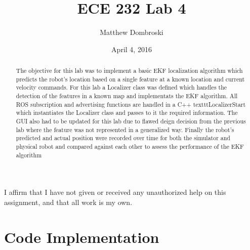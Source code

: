 \documentclass[letterpaper,12pt]{article}
\begin{document}
\title{ECE 232 Lab 4}
\author{Matthew Dombroski}
\date{April 4, 2016}
\maketitle


 I affirm that I have not given or received any unauthorized help on this assignment,
and that all work is my own.
\begin{abstract}
The objective for this lab was to implement a basic EKF localization algorithm which predicts the robot's location based on a single feature at a known location and current velocity commands. For this lab a Localizer class was defined which handles the detection of the features in a known map and implementats the EKF algorithm. All ROS subscription and advertising functions are handled in a C++ texttt{LocalizerStart} which instantiates the Localizer class and passes to it the required information. The GUI also had to be updated for this lab due to flawed deign decision from the previous lab where the feature was not represented in a generalized way. Finally the robot's predicted and actual position were recorded over time for both the simulator and physical robot and compared against each other to assess the performance of the EKF algorithm 
\end{abstract}


\section{Code Implementation}
\end{document}
